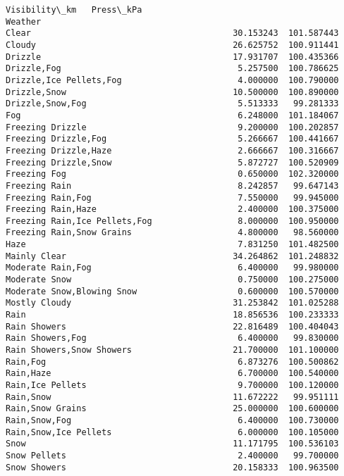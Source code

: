 \documentclass[11pt]{article}
\begin{document}
\begin{tcolorbox}[breakable, size=fbox, boxrule=.5pt, pad at break*=1mm, opacityfill=0]
\begin{Verbatim}[commandchars=\\\{\}]
                                         Visibility\_km   Press\_kPa
Weather
Clear                                        30.153243  101.587443
Cloudy                                       26.625752  100.911441
Drizzle                                      17.931707  100.435366
Drizzle,Fog                                   5.257500  100.786625
Drizzle,Ice Pellets,Fog                       4.000000  100.790000
Drizzle,Snow                                 10.500000  100.890000
Drizzle,Snow,Fog                              5.513333   99.281333
Fog                                           6.248000  101.184067
Freezing Drizzle                              9.200000  100.202857
Freezing Drizzle,Fog                          5.266667  100.441667
Freezing Drizzle,Haze                         2.666667  100.316667
Freezing Drizzle,Snow                         5.872727  100.520909
Freezing Fog                                  0.650000  102.320000
Freezing Rain                                 8.242857   99.647143
Freezing Rain,Fog                             7.550000   99.945000
Freezing Rain,Haze                            2.400000  100.375000
Freezing Rain,Ice Pellets,Fog                 8.000000  100.950000
Freezing Rain,Snow Grains                     4.800000   98.560000
Haze                                          7.831250  101.482500
Mainly Clear                                 34.264862  101.248832
Moderate Rain,Fog                             6.400000   99.980000
Moderate Snow                                 0.750000  100.275000
Moderate Snow,Blowing Snow                    0.600000  100.570000
Mostly Cloudy                                31.253842  101.025288
Rain                                         18.856536  100.233333
Rain Showers                                 22.816489  100.404043
Rain Showers,Fog                              6.400000   99.830000
Rain Showers,Snow Showers                    21.700000  101.100000
Rain,Fog                                      6.873276  100.500862
Rain,Haze                                     6.700000  100.540000
Rain,Ice Pellets                              9.700000  100.120000
Rain,Snow                                    11.672222   99.951111
Rain,Snow Grains                             25.000000  100.600000
Rain,Snow,Fog                                 6.400000  100.730000
Rain,Snow,Ice Pellets                         6.000000  100.105000
Snow                                         11.171795  100.536103
Snow Pellets                                  2.400000   99.700000
Snow Showers                                 20.158333  100.963500

\end{Verbatim}
\end{tcolorbox}
\end{document}
